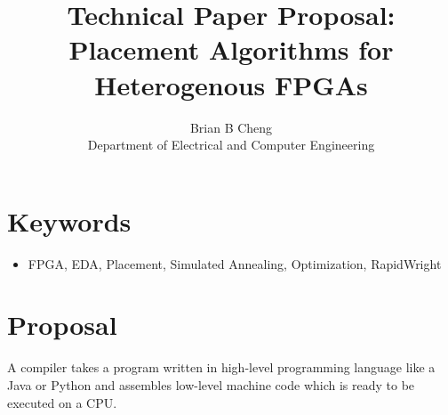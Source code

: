 \documentclass{article}
\begin{document}
\title{Technical Paper Proposal: \\ Placement Algorithms for Heterogenous FPGAs}
\author{Brian B Cheng \\ Department of Electrical and Computer Engineering}


\date{}
\maketitle

\section{Keywords}
\begin{itemize}
    \item FPGA, EDA, Placement, Simulated Annealing, Optimization, RapidWright
\end{itemize}


\section{Proposal}
    A compiler takes a program written in high-level programming language like a Java or Python and assembles low-level machine code which is ready to be executed on a CPU.
\end{document}
